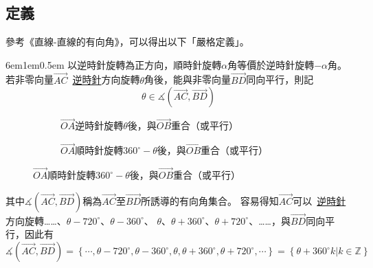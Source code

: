 \documentclass[12pt]{article}
\begin{document}
\subsection{定義}
參考《直線-直線的有向角》，可以得出以下「嚴格定義」。
\begin{mybox}[嚴格定義]{6em}{1em}{0.5em}
    以逆時針旋轉為正方向，順時針旋轉$\alpha$角等價於逆時針旋轉$-\alpha$角。
    若非零向量$\overrightarrow{AC}$\ \underline{逆時針}方向旋轉$\theta$角後，能與非零向量$\overrightarrow{BD}$同向平行，則記
    $$
        \theta\in\measuredangle{\left(\overrightarrow{AC},\overrightarrow{BD}\right)}
    $$
    \begin{figure}[H]
        \begin{subfigure}[b]{0.45\textwidth}
            \centering
            \label{fig:DA_counterclockwise_1_s2}
            \caption{$\overrightarrow{OA}$逆時針旋轉$\theta$後，與$\overrightarrow{OB}$重合（或平行）}
        \end{subfigure}
        \hfill
        \begin{subfigure}[b]{0.45\textwidth}
            \centering
            \label{fig:DA_clockwise_1_s2}
            \caption{$\overrightarrow{OA}$順時針旋轉$360^{\circ}-\theta$後，與$\overrightarrow{OB}$重合（或平行）}
        \end{subfigure}    
    \end{figure}
    
    其中$\measuredangle{\left(\overrightarrow{AC},\overrightarrow{BD}\right)}$稱為$\overrightarrow{AC}$至$\overrightarrow{BD}$所誘導的有向角集合。
    容易得知$\overrightarrow{AC}$可以\ \underline{逆時針}方向旋轉……、$\theta-720^{\circ}$、$\theta-360^{\circ}$、
    $\theta$、$\theta+360^{\circ}$、$\theta+720^{\circ}$、……，與$\overrightarrow{BD}$同向平行，因此有
    $$
        \measuredangle{\left(\overrightarrow{AC},\overrightarrow{BD}\right)}
        =\left\{\cdots, \theta-720^{\circ}, \theta-360^{\circ}, \theta, \theta+360^{\circ}, \theta+720^{\circ}, \cdots\right\}
        =\left\{\theta+360^{\circ}k\left|k\in\mathbb{Z}\right.\right\}
    $$
\end{mybox}
\end{document}
